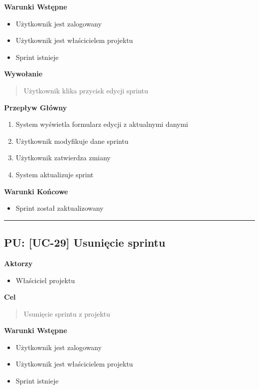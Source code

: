 \vspace{0.2cm}
\noindent\textbf{Warunki Wstępne}
\begin{itemize}
    \item Użytkownik jest zalogowany
    \item Użytkownik jest właścicielem projektu
    \item Sprint istnieje
\end{itemize}

\vspace{0.2cm}
\noindent\textbf{Wywołanie}
\begin{quote}
    Użytkownik klika przycisk edycji sprintu
\end{quote}

\vspace{0.2cm}
\noindent\textbf{Przepływ Główny}
\begin{enumerate}
    \item System wyświetla formularz edycji z aktualnymi danymi
    \item Użytkownik modyfikuje dane sprintu
    \item Użytkownik zatwierdza zmiany
    \item System aktualizuje sprint
\end{enumerate}

\vspace{0.2cm}
\noindent\textbf{Warunki Końcowe}
\begin{itemize}
    \item Sprint został zaktualizowany
\end{itemize}


\hrule
\vspace{1cm}

\subsection*{PU: [UC-29] Usunięcie sprintu}

\noindent\textbf{Aktorzy}
\begin{itemize}
    \item Właściciel projektu
\end{itemize}

\vspace{0.2cm}
\noindent\textbf{Cel}
\begin{quote}
    Usunięcie sprintu z projektu
\end{quote}

\vspace{0.2cm}
\noindent\textbf{Warunki Wstępne}
\begin{itemize}
    \item Użytkownik jest zalogowany
    \item Użytkownik jest właścicielem projektu
    \item Sprint istnieje
\end{itemize}

